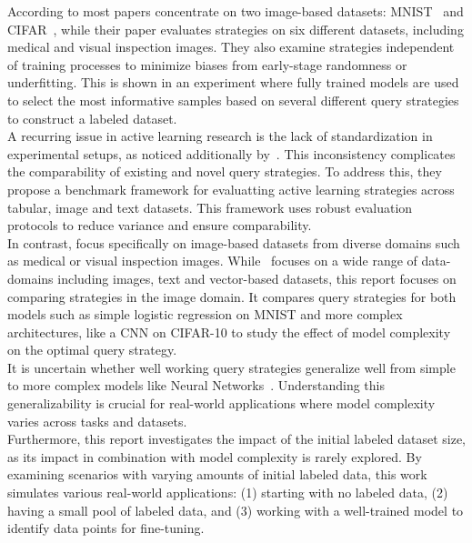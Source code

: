 \documentclass{article}
\theoremstyle{plain}
\theoremstyle{definition}
\theoremstyle{remark}
\begin{document}
According to \cite{ueno_benchmarkingofquerystrategies} most papers concentrate on two image-based datasets: MNIST~\cite{mnist} and CIFAR~\cite{cifar}, while their paper evaluates strategies on six different datasets, including medical and visual inspection images. They also examine strategies independent of training processes to minimize biases from early-stage randomness or underfitting. This is shown in an experiment where fully trained models are used to select the most informative samples based on several different query strategies to construct a labeled dataset. \\ 
A recurring issue in active learning research is the lack of standardization in experimental setups, as noticed additionally by~\cite{werner_comparableactivelearning}. This inconsistency complicates the comparability of existing and novel query strategies. To address this, they propose a benchmark framework for evaluatting active learning strategies across tabular, image and text datasets. This framework uses robust evaluation protocols to reduce variance and ensure comparability. \\
In contrast, \cite{ueno_benchmarkingofquerystrategies} focus specifically on image-based datasets from diverse domains such as medical or visual inspection images. While~\cite{werner_comparableactivelearning} focuses on a wide range of data-domains including images, text and vector-based datasets, this report focuses on comparing strategies in the image domain. 
It compares query strategies for both models such as simple logistic regression on MNIST and more complex architectures, like a CNN on CIFAR-10 to study the effect of model complexity on the optimal query strategy. \\
It is uncertain whether well working query strategies generalize well from simple to more complex models like Neural Networks~\cite{schröder_surveyactivelearningtext}. Understanding this generalizability is crucial for real-world applications where model complexity varies across tasks and datasets. \\
Furthermore, this report investigates the impact of the initial labeled dataset size, as its impact in combination with model complexity is rarely explored. 
By examining scenarios with varying amounts of initial labeled data, this work simulates various real-world applications: (1) starting with no labeled data, (2) having a small pool of labeled data, and (3) working with a well-trained model to identify data points for fine-tuning.
\\
\\
\end{document}
